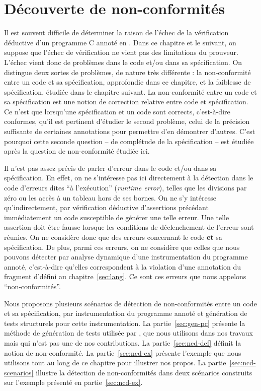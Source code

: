 
\chapter{Découverte de non-conformités}
\label{sec:ncd}

\chapterintro


Il est souvent difficile de déterminer la raison de l'échec de la vérification
déductive d'un programme C annoté en \eacsl.
Dans ce chapitre et le suivant, on suppose que l'échec de vérification ne vient
pas des limitations du prouveur.
L'échec vient donc de problèmes dans le code et/ou dans sa spécification.
On distingue deux sortes de problèmes, de nature très différente : la
non-conformité entre un code et sa spécification, approfondie dans ce chapitre,
et la faiblesse de spécification, étudiée dans le chapitre suivant.
La non-conformité entre un code et sa spécification est une notion de correction
relative entre code et spécification.
Ce n'est que lorsqu'une spécification et un code sont corrects, c'est-à-dire
conformes, qu'il est pertinent d'étudier le second problème, celui de la
précision suffisante de certaines annotations pour permettre d'en démontrer
d'autres.
C'est pourquoi cette seconde question -- de complétude de la spécification --
est étudiée après la question de non-conformité étudiée ici.

Il n'est pas assez précis de parler d'erreur dans le code et/ou dans sa
spécification.
En effet, on ne s'intéresse pas ici directement à la détection dans le code
d'erreurs dites ``à l'exécution'' (\textit{runtime error}), telles que les
divisions par zéro ou les accès à un tableau hors de ses bornes.
On ne s'y intéresse qu'indirectement, par vérification déductive d'assertions
précédant immédiatement un code susceptible de générer une telle erreur.
Une telle assertion doit être fausse lorsque les conditions de déclenchement de
l'erreur sont réunies.
On ne considère donc que des erreurs concernant le code \textbf{et} sa
spécification.
De plus, parmi ces erreurs, on ne considère que celles que nous pouvons
détecter par analyse dynamique d'une instrumentation du programme annoté,
c'est-à-dire qu'elles correspondent à la violation d'une annotation du fragment
d'\eacsl défini au chapitre~\ref{sec:lang}.
Ce sont ces erreurs que nous appelons ``non-conformités''.

Nous proposons plusieurs scénarios de détection de non-conformités entre un code
et sa spécification, par instrumentation du programme annoté et génération de
tests structurels pour cette instrumentation.
La partie~\ref{sec:gen-pc} présente la méthode de génération de tests
utilisée par \pathcrawler, que nous utilisons dans nos travaux mais qui n'est
pas une de nos contributions.
La partie~\ref{sec:ncd-def} définit la notion de non-conformité.
La partie~\ref{sec:ncd-ex} présente l'exemple que nous utilisons tout au long
de ce chapitre pour illustrer nos propos.
La partie~\ref{sec:ncd-scenarios} illustre la détection de non-conformités dans
deux scénarios construits sur l'exemple présenté en partie~\ref{sec:ncd-ex}.



